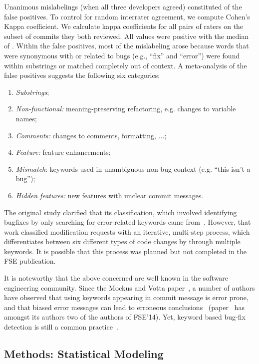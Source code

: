\documentclass[acmsmall]{acmart}
\begin{document}
Unanimous mislabelings (when all three developers agreed) constituted \commitsUnanimousFalsePositives
of the false positives. To control for random interrater agreement, we
compute Cohen's Kappa coefficient. We calculate kappa
coefficients for all pairs of raters on the subset of commits they both
reviewed. All values were positive with the median of \commitsKappaMedian. Within the false
positives, most of the mislabeling arose because words that were synonymous
with or related to bugs (e.g., ``fix'' and ``error'') were found within
substrings or matched completely out of context. A meta-analysis of the
false positives suggests the following six categories:
\begin{enumerate}
\item {\it Substrings};
\item {\it Non-functional:} meaning-preserving refactoring, e.g. changes to
  variable names;
\item {\it Comments:} changes to comments, formatting, ...;
\item {\it Feature:} feature enhancements;
\item {\it Mismatch}: keywords used in unambiguous non-bug context
  (e.g. ``this isn't a bug'');
\item {\it Hidden features:} new features with unclear commit messages.
\end{enumerate}
The original study clarified that its classification, which involved
identifying bugfixes by only searching for error-related keywords came
from~\cite{Mockus00}.  However, that work classified modification requests
with an iterative, multi-step process, which differentiates between six
different types of code changes by through multiple keywords. It is possible
that this process was planned but not completed in the FSE publication.

It is noteworthy that the above concerned are well known in the
software engineering community. Since the Mockus and Votta
paper~\cite{Mockus00}, a number of authors have observed that using keywords
appearing in commit message is error prone, and that biased error messages
can lead to erroneous conclusions~\cite{Bird,Herzig,Tian} (paper~\cite{Bird}
has amongst its authors two of the authors of FSE'14).  Yet, keyword based
bug-fix detection is still a common practice~\cite{Casalnuovo,Dyer}.  




\subsection{Methods: Statistical Modeling}
\end{document}
